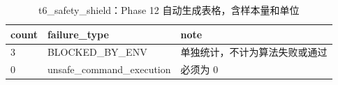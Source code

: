 \begin{table}[htbp]
\centering
\caption{t6_safety_shield：Phase 12 自动生成表格，含样本量和单位}
\begin{tabular}{lll}
\hline
count & failure_type & note \\
\hline
3 & BLOCKED\_BY\_ENV & 单独统计，不计为算法失败或通过 \\
0 & unsafe\_command\_execution & 必须为 0 \\
\hline
\end{tabular}
\end{table}

